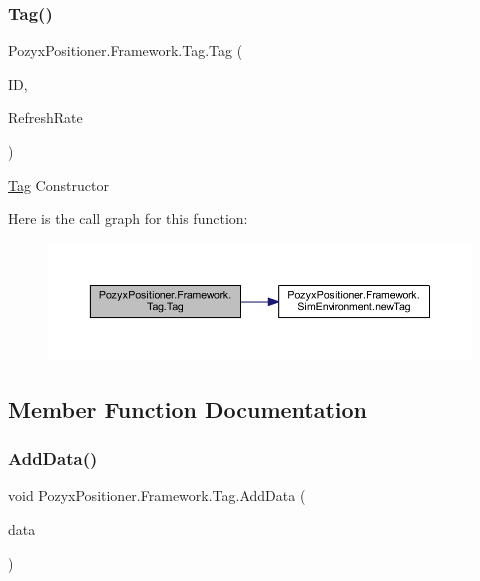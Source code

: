 \subsubsection{\texorpdfstring{Tag()}{Tag()}}
{\footnotesize\ttfamily Pozyx\+Positioner.\+Framework.\+Tag.\+Tag (\begin{DoxyParamCaption}\item[{string}]{ID,  }\item[{int}]{Refresh\+Rate }\end{DoxyParamCaption})}



\hyperlink{class_pozyx_positioner_1_1_framework_1_1_tag}{Tag} Constructor 

Here is the call graph for this function\+:\nopagebreak
\begin{figure}[H]
\begin{center}
\leavevmode
\includegraphics[width=350pt]{class_pozyx_positioner_1_1_framework_1_1_tag_a9b58a1a5756bf3c8cda1e2afd32276b2_cgraph}
\end{center}
\end{figure}


\subsection{Member Function Documentation}
\mbox{\label{class_pozyx_positioner_1_1_framework_1_1_tag_ac2741e137c420ad71f64ee2d3d5fefe8}} 
\subsubsection{\texorpdfstring{Add\+Data()}{AddData()}}
{\footnotesize\ttfamily void Pozyx\+Positioner.\+Framework.\+Tag.\+Add\+Data (\begin{DoxyParamCaption}\item[{\hyperlink{struct_pozyx_positioner_1_1_framework_1_1_pos_data}{Pos\+Data}}]{data }\end{DoxyParamCaption})}




